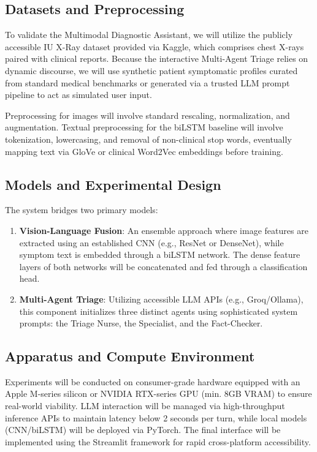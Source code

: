 \documentclass[11pt,a4paper]{article}
\begin{document}
\subsection{Datasets and Preprocessing}
To validate the Multimodal Diagnostic Assistant, we will utilize the publicly accessible IU X-Ray dataset provided via Kaggle, which comprises chest X-rays paired with clinical reports. Because the interactive Multi-Agent Triage relies on dynamic discourse, we will use synthetic patient symptomatic profiles curated from standard medical benchmarks or generated via a trusted LLM prompt pipeline to act as simulated user input. 

Preprocessing for images will involve standard rescaling, normalization, and augmentation. Textual preprocessing for the biLSTM baseline will involve tokenization, lowercasing, and removal of non-clinical stop words, eventually mapping text via GloVe or clinical Word2Vec embeddings before training.

\subsection{Models and Experimental Design}
The system bridges two primary models:
\begin{enumerate}[label=\textbf{\arabic*.}]
    \item \textbf{Vision-Language Fusion}: An ensemble approach where image features are extracted using an established CNN (e.g., ResNet or DenseNet), while symptom text is embedded through a biLSTM network. The dense feature layers of both networks will be concatenated and fed through a classification head.
    \item \textbf{Multi-Agent Triage}: Utilizing accessible LLM APIs (e.g., Groq/Ollama), this component initializes three distinct agents using sophisticated system prompts: the Triage Nurse, the Specialist, and the Fact-Checker. 
\end{enumerate}

\subsection{Apparatus and Compute Environment}
Experiments will be conducted on consumer-grade hardware equipped with an Apple M-series silicon or NVIDIA RTX-series GPU (min. 8GB VRAM) to ensure real-world viability. LLM interaction will be managed via high-throughput inference APIs to maintain latency below 2 seconds per turn, while local models (CNN/biLSTM) will be deployed via PyTorch. The final interface will be implemented using the Streamlit framework for rapid cross-platform accessibility.
\end{document}

